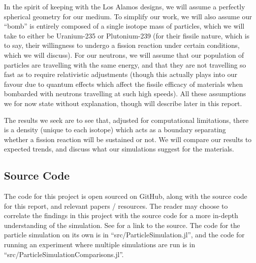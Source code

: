 In the spirit of keeping with the Los Alamos designs, we will assume a perfectly spherical geometry for our medium. 
To simplify our work, we will also assume our ``bomb'' is entirely composed of a single isotope mass of particles, which 
we will take to either be Uranium-235 or Plutonium-239 (for their fissile nature, which is to say, their willingness 
to undergo a fission reaction under certain conditions, which we will discuss). For our neutrons, we will assume that 
our population of particles are travelling with the same energy, and that they are not travelling so fast as to require relativistic 
adjustments (though this actually plays into our favour due to quantum effects which affect the fissile efficacy of materials 
when bombarded with neutrons travelling at such high speeds). All these assumptions we for now state without explanation, though 
will describe later in this report.

The results we seek are to see that, adjusted for computational limitations, there is a density (unique to each isotope) 
which acts as a boundary separating whether a fission reaction will be sustained or not. We will compare our results 
to expected trends, and discuss what our simulations suggest for the materials.

\subsection{Source Code}
The code for this project is open sourced on GitHub, along with the source code for this report, and relevant papers / resources. 
The reader may choose to correlate the findings in this project with the source code for a more in-depth understanding of the 
simulation. See \cite{project-src-code} for a link to the source. The code for the particle simulation on its own is in ``src/ParticleSimulation.jl'',
and the code for running an experiment where multiple simulations are run is in \\``src/ParticleSimulationComparisons.jl''.